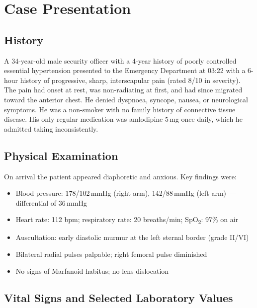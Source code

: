 \section{Case Presentation}

\subsection{History}

A 34-year-old male security officer with a 4-year history of poorly controlled essential
hypertension presented to the Emergency Department at 03:22 with a 6-hour history of
progressive, sharp, interscapular pain (rated 8/10 in severity). The pain had onset at rest,
was non-radiating at first, and had since migrated toward the anterior chest. He denied
dyspnoea, syncope, nausea, or neurological symptoms. He was a non-smoker with no family history
of connective tissue disease. His only regular medication was amlodipine 5\,mg once daily, which
he admitted taking inconsistently.

\subsection{Physical Examination}

On arrival the patient appeared diaphoretic and anxious. Key findings were:

\begin{itemize}
  \item Blood pressure: 178/102\,mmHg (right arm), 142/88\,mmHg (left arm) — differential of
        36\,mmHg
  \item Heart rate: 112 bpm; respiratory rate: 20 breaths/min; SpO\textsubscript{2}: 97\% on air
  \item Auscultation: early diastolic murmur at the left sternal border (grade II/VI)
  \item Bilateral radial pulses palpable; right femoral pulse diminished
  \item No signs of Marfanoid habitus; no lens dislocation
\end{itemize}

\subsection{Vital Signs and Selected Laboratory Values}

